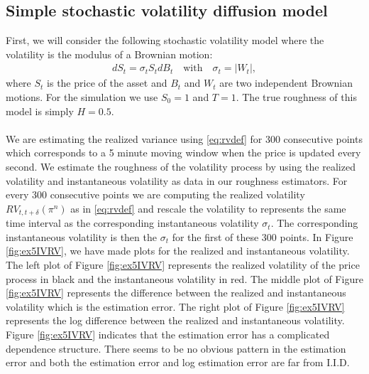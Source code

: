 \documentclass{article}
\begin{document}
\subsection{Simple stochastic volatility diffusion model}
First, we will consider the following stochastic volatility model where the volatility is the modulus of a Brownian motion:
\begin{align}
dS_t = \sigma_t S_t dB_t \quad \text{with} \quad \sigma_t = \lvert W_t \rvert, \label{eq:simple}
\end{align}
where $S_t$ is the price of the asset and $B_t$ and $W_t$ are two independent Brownian motions. For the simulation we use $S_0=1$ and $T=1$. The true roughness of this model is simply $H=0.5$.\\\\
We are estimating the realized variance using \eqref{eq:rvdef} for 300 consecutive points which corresponds to a 5 minute moving window when the price is updated every second. We estimate the roughness of the volatility process by using the realized volatility and instantaneous volatility as data in our roughness estimators. For every 300 consecutive points we are computing the realized volatility $RV_{t,t+\delta}(\pi^n)$ as in \eqref{eq:rvdef} and rescale the volatility to represents the same time interval as the corresponding instantaneous volatility $\sigma_t$. The corresponding instantaneous volatility is then the $\sigma_t$ for the first of these 300 points. In Figure \ref{fig:ex5IVRV}, we have made plots for the realized and instantaneous volatility. The left plot of Figure \ref{fig:ex5IVRV} represents the realized volatility of the price process in black and the instantaneous volatility in red. The middle plot of Figure \ref{fig:ex5IVRV} represents the difference between the realized and instantaneous volatility which is the estimation error. The right plot of Figure \ref{fig:ex5IVRV} represents the log difference between the realized and instantaneous volatility. Figure \ref{fig:ex5IVRV} indicates that the estimation error has a complicated dependence structure. There seems to be no obvious pattern in the estimation error and both the estimation error and log estimation error are far from I.I.D. 
\end{document}
